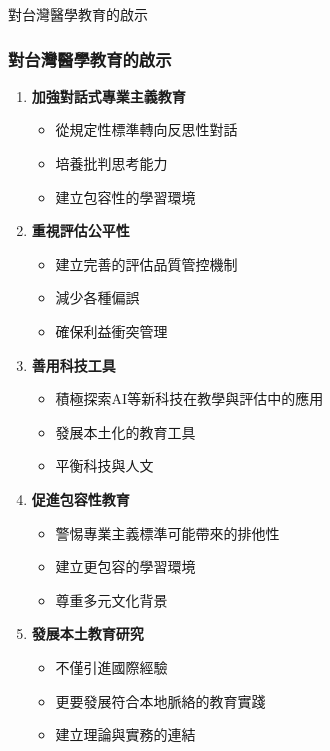 \documentclass[aspectratio=169]{beamer}
\begin{document}
\begin{frame}{對台灣醫學教育的啟示}
\frametitle{對台灣醫學教育的啟示}

\begin{enumerate}
    \item \textbf{加強對話式專業主義教育}
    \begin{itemize}
        \item 從規定性標準轉向反思性對話
        \item 培養批判思考能力
        \item 建立包容性的學習環境
    \end{itemize}
    
    \item \textbf{重視評估公平性}
    \begin{itemize}
        \item 建立完善的評估品質管控機制
        \item 減少各種偏誤
        \item 確保利益衝突管理
    \end{itemize}
    
    \item \textbf{善用科技工具}
    \begin{itemize}
        \item 積極探索AI等新科技在教學與評估中的應用
        \item 發展本土化的教育工具
        \item 平衡科技與人文
    \end{itemize}
    
    \item \textbf{促進包容性教育}
    \begin{itemize}
        \item 警惕專業主義標準可能帶來的排他性
        \item 建立更包容的學習環境
        \item 尊重多元文化背景
    \end{itemize}
    
    \item \textbf{發展本土教育研究}
    \begin{itemize}
        \item 不僅引進國際經驗
        \item 更要發展符合本地脈絡的教育實踐
        \item 建立理論與實務的連結
    \end{itemize}
\end{enumerate}
\end{frame}
\end{document}
